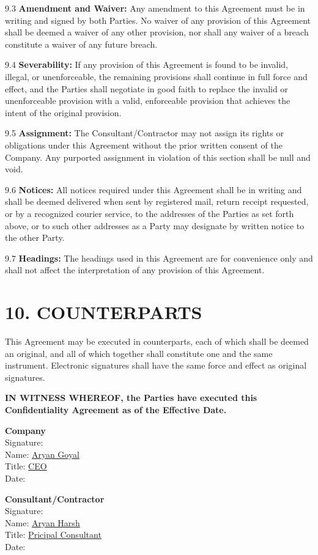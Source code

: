 \documentclass[12pt]{article}
\begin{document}
9.3 \textbf{Amendment and Waiver:} Any amendment to this Agreement must be in writing and signed by both Parties. No waiver of any provision of this Agreement shall be deemed a waiver of any other provision, nor shall any waiver of a breach constitute a waiver of any future breach.

9.4 \textbf{Severability:} If any provision of this Agreement is found to be invalid, illegal, or unenforceable, the remaining provisions shall continue in full force and effect, and the Parties shall negotiate in good faith to replace the invalid or unenforceable provision with a valid, enforceable provision that achieves the intent of the original provision.

9.5 \textbf{Assignment:} The Consultant/Contractor may not assign its rights or obligations under this Agreement without the prior written consent of the Company. Any purported assignment in violation of this section shall be null and void.

9.6 \textbf{Notices:} All notices required under this Agreement shall be in writing and shall be deemed delivered when sent by registered mail, return receipt requested, or by a recognized courier service, to the addresses of the Parties as set forth above, or to such other addresses as a Party may designate by written notice to the other Party.

9.7 \textbf{Headings:} The headings used in this Agreement are for convenience only and shall not affect the interpretation of any provision of this Agreement.

\section*{10. COUNTERPARTS}

This Agreement may be executed in counterparts, each of which shall be deemed an original, and all of which together shall constitute one and the same instrument. Electronic signatures shall have the same force and effect as original signatures.

\vspace{1cm}

\textbf{IN WITNESS WHEREOF, the Parties have executed this Confidentiality Agreement as of the Effective Date.}

\vspace{1cm}

\textbf{Company} \\
Signature: \underline{\hspace{6cm}} \\
Name: \underline{Aryan Goyal} \\
Title: \underline{CEO} \\
Date: \underline{\hspace{5cm}}

\vspace{1cm}

\textbf{Consultant/Contractor} \\
Signature: \underline{\hspace{6cm}} \\
Name: \underline{Aryan Harsh} \\
Title: \underline{Pricipal Consultant} \\
Date: \underline{\hspace{5cm}}
\end{document}
